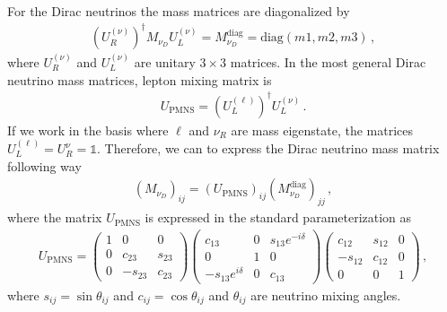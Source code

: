 \documentclass[12pt]{article}
\begin{document}
For the Dirac neutrinos the mass matrices are diagonalized by
\begin{align}
(U^{(\nu)}_R)^{\dagger} M_{\nu_{D}} U^{(\nu)}_L = M_{\nu_{D}}^{\text{diag}} = \text{diag}(m1, m2, m3)\,,
\end{align}
where $U^{(\nu)}_R$ and $U^{(\nu)}_L$  are unitary $3 \times 3$ matrices. In the most general Dirac neutrino mass matrices, lepton mixing matrix is
\begin{align}
U_{\text{PMNS}} = (U^{(\ell)}_L)^{\dagger} U^{(\nu)}_L\,.
\end{align}
If we work in the basis where $\ell$ and $\nu_{R}$ are mass eigenstate, the matrices $U_{L}^{(\ell)} = U_{R}^{\nu} = \mathds{1}$. Therefore, we can to express the Dirac neutrino mass matrix following way
\begin{align}
(M_{\nu_{D}})_{ij} = (U_{\text{PMNS}})_{ij} (M_{\nu_{D}}^{\text{diag}})_{jj}\,,
\end{align}
where the matrix $U_{\text{PMNS}}$ is expressed in the standard parameterization as
\begin{align}
U_{\text{PMNS}} = \begin{pmatrix}
    1 & 0		& 0 \\
    0 & c_{23}  & s_{23} \\
    0 & -s_{23} & c_{23}
\end{pmatrix}
\begin{pmatrix}
    c_{13}  &  0 & s_{13}e^{-i\delta} \\
    0 		&  1 & 0 \\
    -s_{13}e^{i\delta} &  0 & c_{13}
\end{pmatrix}
\begin{pmatrix}
    c_{12}  & s_{12} & 0 \\
    -s_{12} & c_{12} & 0 \\
    0		& 0		 & 1
\end{pmatrix}\,,
\end{align}
where $s_{ij} = \sin \theta_{ij}$ and $c_{ij} = \cos \theta_{ij}$ and $\theta_{ij}$ are neutrino mixing angles.
\end{document}
